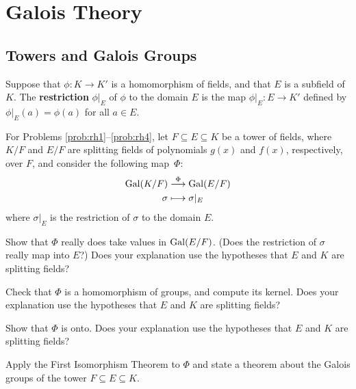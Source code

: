 \chapter{Galois Theory}\label{chap:galois}

\section{Towers and Galois Groups}

\begin{definition}
    Suppose that $\phi:K \longrightarrow K'$ is a homomorphism of fields, and that $E$ is a subfield of $K$. The \textbf{restriction} $\phi|_E$ of $\phi$ to the domain $E$ is the map $\phi|_E : E \longrightarrow K'$ defined by $\phi|_E(a)=\phi(a)$ for all $a\in E$.
\end{definition}

For Problems \ref{prob:rh1}--\ref{prob:rh4},
let $F\subseteq E\subseteq K$ be a tower of fields, where $K/F$ and $E/F$ are splitting fields of polynomials $g(x)$ and $f(x)$, respectively, over $F$, and consider the following map~$\Phi$:
\begin{align*}
\operatorname{Gal}(K/F) &\stackrel{\Phi}{\longrightarrow} \operatorname{Gal}(E/F) \\
\sigma &\longmapsto \sigma|_E
\end{align*}
where $\sigma|_E$ is the restriction of $\sigma$ to the domain $E$.

\begin{problem}\label{prob:rh1}
    Show that $\Phi$ really does take values in $\operatorname{Gal}(E/F)$. (Does the restriction of $\sigma$ really map into $E$?) Does your explanation use the hypotheses that $E$ and $K$ are splitting fields?
\end{problem}


\begin{problem}
Check that $\Phi$ is a homomorphism of groups, and compute its kernel. Does your explanation use the hypotheses that $E$ and $K$ are splitting fields?
\end{problem}


\begin{problem}
Show that $\Phi$ is onto. Does your explanation use the hypotheses that $E$ and $K$ are splitting fields?
\end{problem}



\begin{problem}\label{prob:rh4}
    Apply the First Isomorphism Theorem to $\Phi$ and state a theorem about the Galois groups of the tower $F\subseteq E \subseteq K$.
\end{problem}



